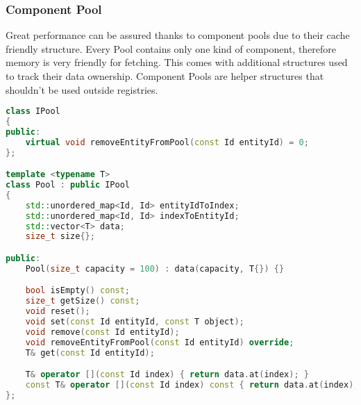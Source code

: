 \newpage

\subsubsection{Component Pool}
\hspace{\parindent}
Great performance  can be assured thanks to component pools due to their cache friendly structure.
Every Pool contains only one kind of component, therefore memory is very friendly for fetching. This comes with additional structures used to track their data ownership.
Component Pools are helper structures that shouldn't be used outside registries.
\begin{lstlisting}[language=c++, caption=Components Pool class (./engine/include/tsengine/ecs/ecs.h)]
class IPool
{
public:
    virtual void removeEntityFromPool(const Id entityId) = 0;
};

template <typename T>
class Pool : public IPool
{
    std::unordered_map<Id, Id> entityIdToIndex;
    std::unordered_map<Id, Id> indexToEntityId;
    std::vector<T> data;
    size_t size{};

public:
    Pool(size_t capacity = 100) : data(capacity, T{}) {}

    bool isEmpty() const;
    size_t getSize() const;
    void reset();
    void set(const Id entityId, const T object);
    void remove(const Id entityId);
    void removeEntityFromPool(const Id entityId) override;
    T& get(const Id entityId);

    T& operator [](const Id index) { return data.at(index); }
    const T& operator [](const Id index) const { return data.at(index); }
};
\end{lstlisting}

\newpage

